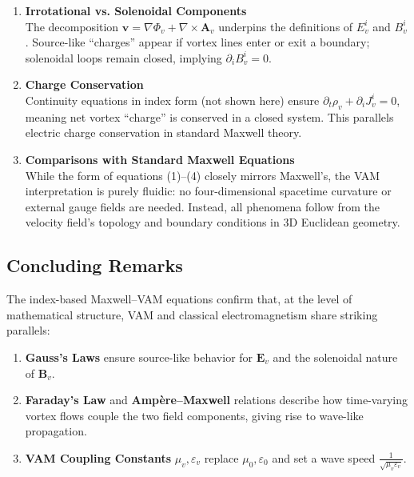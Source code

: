 \documentclass[aps,preprint,superscriptaddress]{revtex4-2}
\begin{document}
    \begin{enumerate}
        \item \textbf{Irrotational vs. Solenoidal Components} \\
    The decomposition \(\mathbf{v} = \nabla \Phi_v + \nabla\times \mathbf{A}_v\) underpins the definitions of \(E_{v}^i\) and \(B_{v}^i\). Source-like “charges” appear if vortex lines enter or exit a boundary; solenoidal loops remain closed, implying \(\partial_i B_{v}^i=0\).
        \item \textbf{Charge Conservation} \\
    Continuity equations in index form (not shown here) ensure \(\partial_t \rho_v + \partial_i J_{v}^i = 0\), meaning net vortex “charge” is conserved in a closed system. This parallels electric charge conservation in standard Maxwell theory.
        \item \textbf{Comparisons with Standard Maxwell Equations} \\
        While the form of equations (1)--(4) closely mirrors Maxwell’s, the VAM interpretation is purely fluidic: no four-dimensional spacetime curvature or external gauge fields are needed. Instead, all phenomena follow from the velocity field’s topology and boundary conditions in 3D Euclidean geometry.
    \end{enumerate}

    \subsection{Concluding Remarks}

    The index-based Maxwell--VAM equations confirm that, at the level of mathematical structure, VAM and classical electromagnetism share striking parallels:

    \begin{enumerate}
        \item \textbf{Gauss’s Laws} ensure source-like behavior for \(\mathbf{E}_v\) and the solenoidal nature of \(\mathbf{B}_v\).
        \item \textbf{Faraday’s Law} and \textbf{Ampère--Maxwell} relations describe how time-varying vortex flows couple the two field components, giving rise to wave-like propagation.
        \item \textbf{VAM Coupling Constants} \(\mu_v, \varepsilon_v\) replace \(\mu_0, \varepsilon_0\) and set a wave speed \(\frac{1}{\sqrt{\mu_v\varepsilon_v}}\).
    \end{enumerate}
\end{document}
